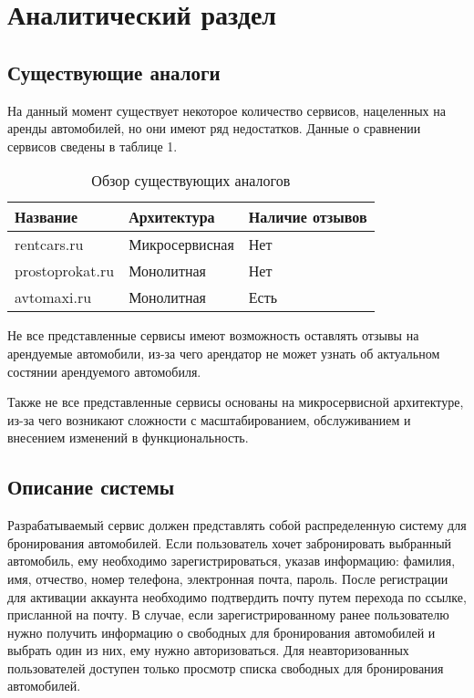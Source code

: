 \chapter{Аналитический раздел}

\section{Существующие аналоги}

На данный момент существует некоторое количество сервисов, нацеленных на аренды автомобилей, но они имеют ряд недостатков. Данные о сравнении сервисов сведены в таблице 1.

\begin{table}[H]
	\caption{Обзор существующих аналогов}
	\begin{center}
		\begin{tabular}{| C{3 cm} | C{4 cm} | C{2.25 cm} |} 
			\hline
			
			\textbf{Название} & \textbf{Архитектура} & \textbf{Наличие отзывов} \\  
			
			\hline
			
			rentcars.ru & Микросервисная & Нет \\
			
			\hline
			
			prostoprokat.ru  & Монолитная & Нет \\
			
			\hline
			
			avtomaxi.ru & Монолитная & Есть \\
			
			\hline
		\end{tabular}
	\end{center}
\end{table}

Не все представленные сервисы имеют возможность оставлять отзывы на арендуемые автомобили, из-за чего арендатор не может узнать об актуальном состянии арендуемого автомобиля.

Также не все представленные сервисы основаны на микросервисной архитектуре, из-за чего возникают сложности с масштабированием, обслуживанием и внесением изменений в функциональность.

\section{Описание системы}

Разрабатываемый сервис должен представлять собой распределенную систему для бронирования автомобилей. Если пользователь хочет забронировать выбранный автомобиль, ему необходимо зарегистрироваться, указав информацию: фамилия, имя, отчество, номер телефона, электронная почта, пароль. После регистрации для активации аккаунта необходимо подтвердить почту путем перехода по ссылке, присланной на почту. В случае, если зарегистрированному ранее пользователю нужно получить информацию о свободных для бронирования автомобилей и выбрать один из них, ему нужно авторизоваться. Для неавторизованных пользователей доступен только просмотр списка свободных для бронирования автомобилей.

